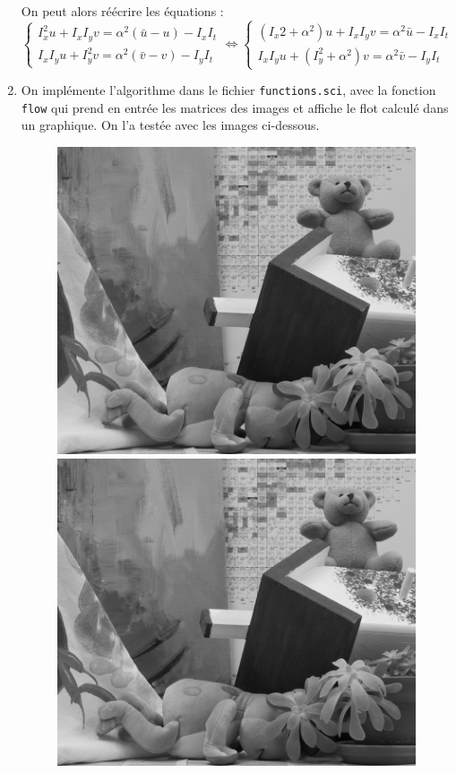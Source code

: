 \begin{enumerate}[questions]
On peut alors réécrire les équations :
\[ 
\begin{cases*}
I_x^2u + I_xI_yv = \alpha^2(\bar{u} - u) - I_xI_t \\
I_xI_yu + I_y^2v = \alpha^2(\bar{v} - v) - I_yI_t
\end{cases*}
\iff 
\begin{cases*}
(I_x2 + \alpha^2)u + I_xI_yv = \alpha^2\bar{u} - I_xI_t \\
I_xI_yu + (I_y^2 + \alpha^2)v = \alpha^2\bar{v} - I_yI_t
\end{cases*}
\]

\item On implémente l'algorithme dans le fichier \verb|functions.sci|, avec la fonction \verb|flow| qui prend en entrée les matrices des images et affiche le flot calculé dans un graphique. On l'a testée avec les images ci-dessous.
\begin{figure}[!h]
\centering
\includegraphics[width=.45\textwidth]{img/q7-orig-1}
\hfill
\includegraphics[width=.45\textwidth]{img/q7-orig-2}
\end{figure}


\end{enumerate}
